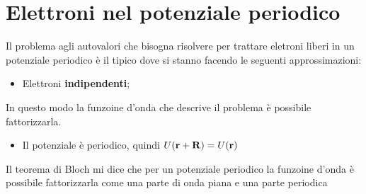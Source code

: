 \section{Elettroni nel potenziale periodico}
Il problema agli autovalori che bisogna risolvere per trattare eletroni liberi in un potenziale periodico è il tipico
dove si stanno facendo le seguenti approssimazioni:
\begin{itemize}
	\item Elettroni \textbf{indipendenti};
\end{itemize}
In questo modo la funzoine d'onda che descrive il problema è possibile fattorizzarla.
\begin{itemize}
	\item Il potenziale è periodico, quindi $U({\it\bf r}  + {\it\bf R} )  = U({\it\bf r}  )$
\end{itemize}
Il teorema di Bloch mi dice che per un potenziale periodico la funzoine d'onda è possibile fattorizzarla come una parte di onda piana e una parte periodica

